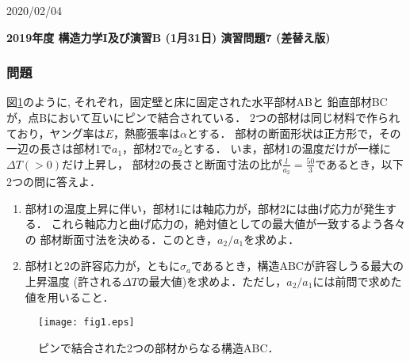 \documentclass[10pt,a4j]{jarticle}
\newlength{\minitwocolumn}
\begin{document}
\newcommand{\fat}[1]{\mbox{\boldmath $#1$}}
\newcommand{\D}{\partial}
\newcommand{\w}{\omega}
\newcommand{\ga}{\alpha}
\newcommand{\gb}{\beta}
\newcommand{\gx}{\xi}
\newcommand{\gz}{\zeta}
\newcommand{\vhat}[1]{\hat{\fat{#1}}}
\newcommand{\spc}{\vspace{0.7\baselineskip}}
\newcommand{\halfspc}{\vspace{0.3\baselineskip}}

\pagestyle{empty}
\newcommand{\twofig}[2]
 {
   \begin{figure}[h]
     \begin{minipage}[t]{\minitwocolumn}
         \begin{center}   #1
         \end{center}
     \end{minipage}
         \hspace{\columnsep}
     \begin{minipage}[t]{\minitwocolumn}
         \begin{center} #2
         \end{center}
     \end{minipage}
   \end{figure}
 }
\begin{flushright}
	2020/02/04
\end{flushright}
\begin{center}
	{\Large \bf 2019年度 構造力学I及び演習B (1月31日) 演習問題7 (差替え版)} \\
\end{center}
\subsubsection*{問題}
図\ref{fig:fig1}のように, それぞれ，固定壁と床に固定された水平部材ABと
鉛直部材BCが，点Bにおいて互いにピンで結合されている．
2つの部材は同じ材料で作られており，ヤング率は$E$，熱膨張率は$\alpha$とする．
部材の断面形状は正方形で，その一辺の長さは部材1で$a_1$，部材2で$a_2$とする．
いま，部材1の温度だけが一様に$\Delta T(>0)$だけ上昇し，
部材2の長さと断面寸法の比が$\frac{l}{a_2}=\frac{50}{3}$であるとき，以下2つの問に答えよ．
\begin{enumerate}
\item
	部材1の温度上昇に伴い，部材1には軸応力が，部材2には曲げ応力が発生する．
	これら軸応力と曲げ応力の，絶対値としての最大値が一致するよう各々の
	部材断面寸法を決める．このとき，$a_2/a_1$を求めよ．
\item
	部材1と2の許容応力が，ともに$\sigma_a$であるとき，構造ABCが許容しうる最大の上昇温度
	(許される$\Delta T$の最大値)を求めよ．ただし，$a_2/a_1$には前問で求めた値を用いること．
\end{enumerate}
\begin{figure}[h]
	\begin{center}
	\texttt{[image: fig1.eps]} 
	\end{center}
	\caption{ピンで結合された2つの部材からなる構造ABC．} 
	\label{fig:fig1}
\end{figure}
\end{document}
